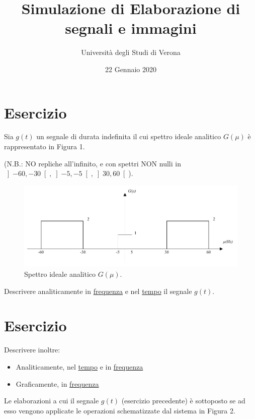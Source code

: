 \documentclass[a4paper]{article}
\begin{document}
	\author{Università degli Studi di Verona}
	\title{Simulazione di Elaborazione di segnali e immagini}
	\date{{\Large 22 Gennaio 2020}}
	\maketitle
	
	\section{Esercizio}
	
	Sia $g\left(t\right)$ un segnale di durata indefinita il cui spettro ideale analitico $G\left(\mu\right)$ è rappresentato in Figura 1.\newline
	
	\noindent
	(N.B.: NO repliche all'infinito, e con spettri NON nulli in $\left]-60,-30\right[, \left]-5,-5\right[, \left]30,60\right[$).
	
	\begin{figure}[!htp]
		\centering
		\includegraphics[width=\textwidth]{img/fig_1.pdf}
		\caption{Spettro ideale analitico $G\left(\mu\right)$.}
	\end{figure}
	
	\noindent
	Descrivere analiticamente in \underline{frequenza} e nel \underline{tempo} il segnale $g\left(t\right)$.\newpage
	
	\section{Esercizio}

	Descrivere inoltre:
	\begin{itemize}
		\item Analiticamente, nel \underline{tempo} e in \underline{frequenza}
		\item Graficamente, in \underline{frequenza}
	\end{itemize}
	Le elaborazioni a cui il segnale $g\left(t\right)$ (esercizio precedente) è sottoposto se ad esso vengono applicate le operazioni schematizzate dal sistema in Figura 2.\newline
	
\end{document}
